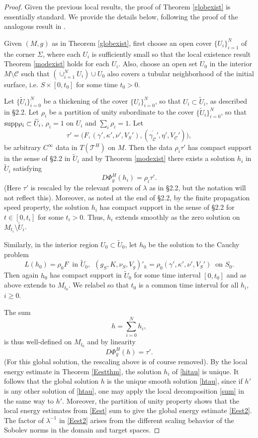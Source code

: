 \documentclass[10pt]{amsart}
\newcommand{\g}{\gamma}
\newcommand{\Si}{\Sigma}
\renewcommand{\k}{\kappa}
\renewcommand{\l}{\lambda}
\newcommand{\cC}{{\mathcal C}}
\newcommand{\cT}{{\mathcal T}}
\newcommand{\be}{\begin{equation}}
\newcommand{\ee}{\end{equation}}
\newcommand{\<}{\langle}
\renewcommand{\>}{\rangle}
\newcommand{\w}{\widetilde}
\theoremstyle{plain}
\theoremstyle{remark}
\theoremstyle{definition}
\numberwithin{equation}{section}
\begin{document}
 \begin{proof}

  Given the previous local results, the proof of Theorem \ref{globexist} is essentially standard. We provide the details below, 
 following the proof of the analogous result in \cite{I}. 
  
  Given $(M, g)$ as in Theorem \ref{globexist}, first choose an open cover $\{U_i\}_{i=1}^N$ of the corner $\Si$, where each $U_i$ is sufficiently 
small so that the local existence result Theorem \ref{modexist} holds for each $U_i$. Also, choose an open set $U_0$ in the interior $M\setminus \cC$ 
such that $(\cup_{i=1}^N U_i)\cup U_0$ also covers a tubular neighborhood of the initial surface, i.e. $S\times [0,t_0]$ for some time $t_0>0$.

Let $\{\w U_i\}_{i=0}^N$ be a thickening of the cover $\{U_i\}_{i=0}^N$, so that $U_i \subset \w U_i$, as described in \S 2.2. Let 
$\rho_i$ be a partition of unity subordinate to the cover $\{\w U_i\}_{i=0}^N$, so that ${\rm supp}\rho_i\subset \w U_i$, $\rho_i = 1$ on 
$U_i$ and  $\sum_i \rho_i=1$. Let 
$$\tau' =\big(F, (\g', \k', \nu', V_S'), (\ring{\g_{\cC}'}, \eta',V_{\cC}') \big),$$
be arbitrary $C^{\infty}$ data in $T(\cT^H)$ on $M$. Then the data $\rho_i \tau'$ has compact support in the sense of \S 2.2 in $\w U_i$ 
and by Theorem \ref{modexist} there exists a solution $h_i$ in $\w U_i$ satisfying 
\be \label{hitau}
D\Phi^H_g(h_i) = \rho_i \tau'. 
\ee
(Here $\tau'$ is rescaled by the relevant powers of $\l$ as in \S 2.2, but the notation will not reflect this). Moreover, as noted at the end of \S 2.2, by the finite propagation 
speed property, the solution $h_i$ has compact support in the sense of \S 2.2 for $t \in [0,t_i]$ for some $t_i > 0$. Thus, $h_i$ extends smoothly as the 
zero solution on $M_{t_i} \setminus \w U_i$. 

   Similarly, in the interior region $U_0 \subset \w U_0$, let $h_0$ be the solution to the Cauchy problem 
$$L(h_0) = \rho_0 F \ \mbox{ in } \w U_0, \ \ (g_S, K, \nu_S, V_g)'_h = \rho_0(\g', \k', \nu', V_S') \ \mbox{ on }S_0.$$
Then again $h_0$ has compact support in $\w U_0$ for some time interval $[0, t_0]$ and as above extends to $M_{t_0}$. We relabel so that 
$t_0$ is a common time interval for all $h_i$, $i \geq 0$. 

  The sum 
\be \label{sum}
h = \sum_{i=0}^N h_i,
\ee
is thus well-defined on $M_{t_0}$ and by linearity
\be \label{htau}
D \Phi_g^H(h) = \tau'.
\ee
(For this global solution, the rescaling above is of course removed). By the local energy estimate in Theorem \ref{Eestthm}, the solution $h_i$ of \eqref{hitau} is 
unique. It follows that the global solution $h$ is the unique smooth solution \eqref{htau}, since if $h'$ is any other solution of \eqref{htau}, one may apply the 
local decomposition \eqref{sum} in the same way to $h'$. Moreover, the partition of unity property shows that the local energy estimates from \eqref{Eest} sum 
to give the global energy estimate \eqref{Eest2}. The factor of $\l^{-1}$ in \eqref{Eest2} arises from the different scaling behavior of the Sobolev norms in the domain and 
target spaces. 


\end{proof}
\end{document}
